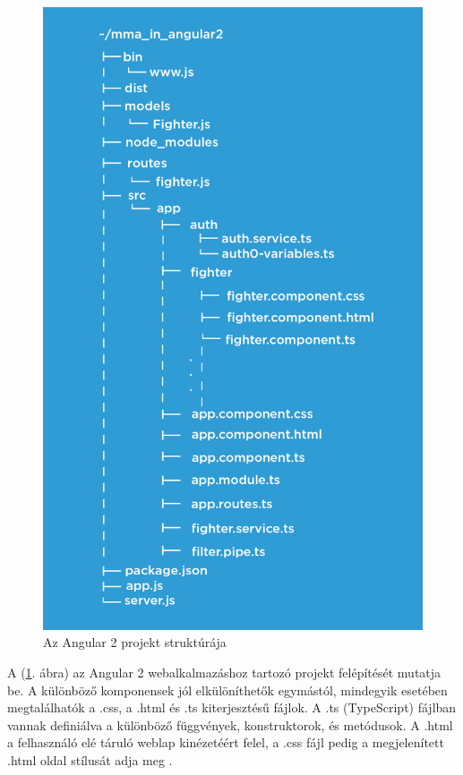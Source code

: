 \begin{figure}[htb]
\centering
\includegraphics[scale=0.7]{kepek/mma_in_angular2.jpeg}
\caption{Az Angular 2 projekt struktúrája}
\label{fig:angular2_structure}
\end{figure}




A (\ref{fig:angular2_structure}. ábra) az Angular 2 webalkalmazáshoz tartozó projekt felépítését mutatja be. A különböző komponensek jól elkülöníthetők egymástól, mindegyik esetében megtalálhatók a .css, a .html és .ts kiterjesztésű fájlok. A .ts (TypeScript) fájlban vannak definiálva a különböző függvények, konstruktorok, és metódusok. A .html a felhasználó elé táruló weblap kinézetéért felel, a .css fájl pedig a megjelenített .html oldal stílusát adja meg\cite{Angular 2 könyv} \cite{Angular 2 oldal}.
